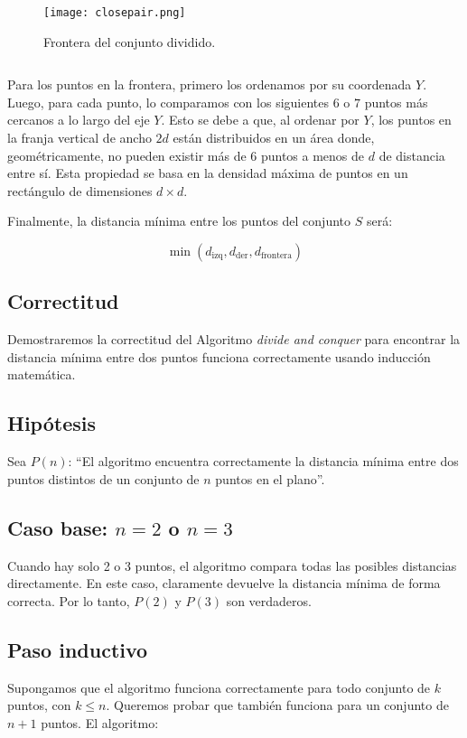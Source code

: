 \documentclass{article}
\begin{document}
\vspace{1em}
 \begin{figure}[H] %
    \centering
    \texttt{[image: closepair.png]} %
    \caption{Frontera del conjunto dividido.}
    \label{fig:etiqueta_imagen}
\end{figure}
\begin{lstlisting}
\end{lstlisting}

Para los puntos en la frontera, primero los ordenamos por su coordenada $Y$. Luego, para cada punto, lo comparamos con los siguientes $6$ o $7$ puntos más cercanos a lo largo del eje $Y$.
Esto se debe a que, al ordenar por $Y$, los puntos en la franja vertical de ancho $2d$ están distribuidos en un área donde, geométricamente, no pueden existir más de 6 puntos a menos de $d$ de distancia entre sí. Esta propiedad se basa en la densidad máxima de puntos en un rectángulo de dimensiones $d \times d$.

\vspace{1em}

Finalmente, la distancia mínima entre los puntos del conjunto $S$ será:

\[
\min(d_{\text{izq}}, d_{\text{der}}, d_{\text{frontera}})
\]



\subsection{Correctitud}
Demostraremos la correctitud del Algoritmo \textit{divide and conquer} para encontrar la distancia mínima entre dos puntos funciona correctamente usando inducción matemática.
\subsection*{Hipótesis}
Sea $P(n)$: “El algoritmo encuentra correctamente la distancia mínima entre dos puntos distintos de un conjunto de $n$ puntos en el plano”.
\subsection*{Caso base: $n = 2$ o $n = 3$}
Cuando hay solo 2 o 3 puntos, el algoritmo compara todas las posibles distancias directamente.  
En este caso, claramente devuelve la distancia mínima de forma correcta.
Por lo tanto, $P(2)$ y $P(3)$ son verdaderos.
\subsection*{Paso inductivo}
Supongamos que el algoritmo funciona correctamente para todo conjunto de $k$ puntos, con $k \leq n$.  
Queremos probar que también funciona para un conjunto de $n+1$ puntos.
El algoritmo:
\end{document}
